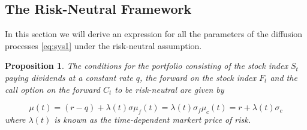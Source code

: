\documentclass{article}
\newtheorem{prop}[thm]{Proposition}
\theoremstyle{definition}
\theoremstyle{remark}
\begin{document}
\subsection{The Risk-Neutral Framework}
In this section we will derive an expression for all the parameters of the diffusion processes \eqref{eq:sys1} under the risk-neutral assumption.

\begin{prop}\label{prop:riskn1}
The conditions for the portfolio consisting of the stock index $S_t$ paying dividends at a constant rate $q$, the forward on the stock index $F_t$ and the call option on the forward $C_t$ to be risk-neutral are given by


\begin{subequations}
\begin{equation}
\mu(t) = (r-q)+\lambda(t) \sigma \label{eq:mu}
\end{equation}
\begin{equation}
\mu_f(t) = \lambda(t) \sigma_f
\end{equation}
\begin{equation}
\mu_c(t) = r+\lambda(t) \sigma_c
\end{equation}
\end{subequations}
where $\lambda(t)$ is known as the time-dependent \emph{markert price of risk}.
\end{prop}
\end{document}
